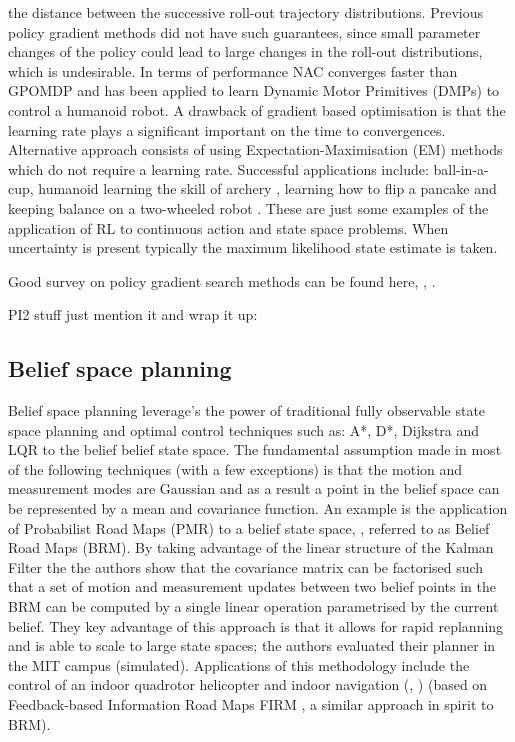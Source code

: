 the distance between the successive roll-out trajectory distributions. Previous policy gradient methods did not have such guarantees,
since small parameter changes of the policy could lead to large changes in the roll-out distributions, which is undesirable. In
terms of performance NAC converges faster than GPOMDP and has been applied to learn Dynamic Motor Primitives (DMPs) to control a 
humanoid robot. 
A drawback of gradient based optimisation is that the learning rate  plays a significant important on the time to convergences. 
Alternative approach consists of using Expectation-Maximisation (EM) methods \cite{PoWER_2009} which do not require a learning rate.
Successful applications include: ball-in-a-cup, humanoid learning the skill of archery \cite{archery_2010}, learning how to 
flip a pancake \cite{pancake_2010} and keeping balance on a two-wheeled robot \cite{Wang2016}. These are just some examples 
of the application of RL to continuous action and state space problems. When uncertainty is present typically the maximum likelihood
state estimate is taken.

Good survey on policy gradient search methods can be found here, \cite{p_search_surv_2011}, \cite{RL_robots_surv_2013}.

PI2 stuff just mention it and wrap it up: \cite{dmp_seq_2012} \cite{dmp_iros_2011} %

\subsection{Belief space planning}

Belief space planning leverage's the power of traditional fully observable state space 
planning and optimal control techniques such as: A*, D*,  Dijkstra and LQR to the belief belief state space. 
The fundamental assumption made in most of the following techniques (with a few exceptions) is that the 
motion and measurement modes are Gaussian and as a result a point in the belief space can be represented by 
a mean and covariance function.
An example is the application of Probabilist Road Maps (PMR) to a belief state space, \cite{BelRoadMap_2009}, 
referred to as Belief Road Maps (BRM). By taking advantage of the linear structure of the Kalman Filter the 
the authors show that the covariance matrix can be factorised such that a set of  motion and measurement updates between two belief 
points in the BRM can be computed by a single linear operation parametrised by the current belief. They key advantage of this 
approach is that it allows for rapid replanning and is able to scale to large state spaces; the authors evaluated their planner 
in the MIT campus (simulated). Applications of this methodology include the control of an indoor quadrotor helicopter \cite{Quadrator_2008} 
and indoor navigation (\cite{FIRM_2011}, \cite{rob_online_bs_icra_2014}) (based on Feedback-based Information Road Maps FIRM , a similar approach in 
spirit to BRM).

